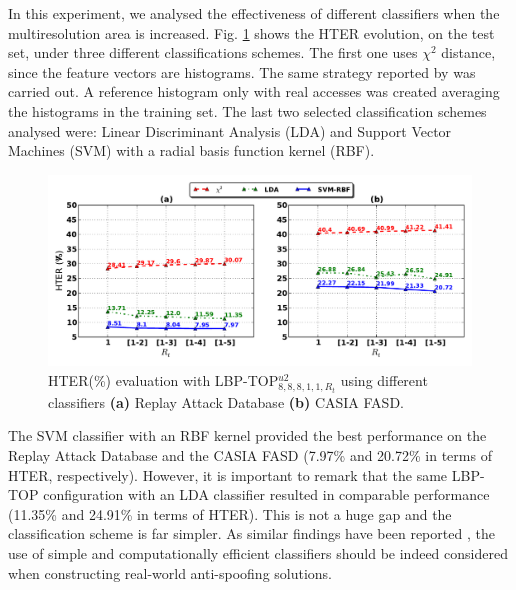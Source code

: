 In this experiment, we analysed the effectiveness of different classifiers when the multiresolution area is increased. Fig. \ref{fig:evaluation_classifiers} shows the HTER evolution, on the test set, under three different classifications schemes. The first one uses $\chi^2$ distance, since the feature vectors are histograms. The same strategy reported by \cite{ChingovskaBIOSIG2012} was carried out. A reference histogram only with real accesses was created averaging the histograms in the training set. The last two selected classification schemes analysed were: Linear Discriminant Analysis (LDA) and Support Vector Machines (SVM) with a radial basis function kernel (RBF).

\begin{figure}[!btb]
\begin{center}
\includegraphics [width=\textwidth] {images/proposed_countermeasure/evaluation_classifiers.pdf}
\caption[HTER(\%) evaluation with LBP-TOP$_{8,8,8,1,1,R_t}^{u2}$ using different classifiers]{HTER(\%) evaluation with LBP-TOP$_{8,8,8,1,1,R_t}^{u2}$ using different classifiers \textbf{(a)} Replay Attack Database \textbf{(b)} CASIA FASD.} \label{fig:evaluation_classifiers}
\end{center}
\end{figure}


The SVM classifier with an RBF kernel provided the best performance on the Replay Attack Database and the CASIA FASD (7.97\% and 20.72\% in terms of HTER, respectively). However, it is important to remark that the same LBP-TOP configuration with an LDA classifier resulted in comparable performance (11.35\% and 24.91\% in terms of HTER). This is not a huge gap and the classification scheme is far simpler. As similar findings have been reported \cite{ChingovskaBIOSIG2012,Komulainen_ICB_2013}, the use of simple and computationally efficient classifiers should be indeed considered when constructing real-world anti-spoofing solutions.


